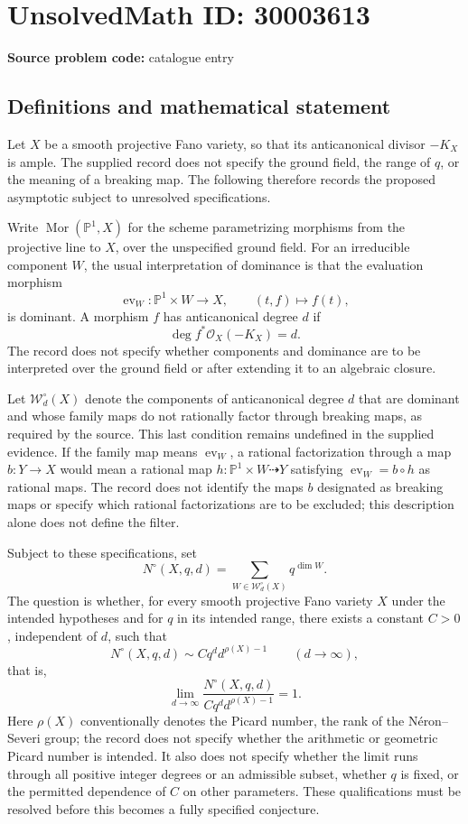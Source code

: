 \documentclass[11pt]{article}
\begin{document}
\section*{UnsolvedMath ID: 30003613}
\textbf{Source problem code:} catalogue entry
\subsection{Definitions and mathematical statement}
Let \(X\) be a smooth projective Fano variety, so that its anticanonical divisor \(-K_X\) is ample. The supplied record does not specify the ground field, the range of \(q\), or the meaning of a breaking map. The following therefore records the proposed asymptotic subject to unresolved specifications.

Write \(\operatorname{Mor}(\mathbb P^1,X)\) for the scheme parametrizing morphisms from the projective line to \(X\), over the unspecified ground field. For an irreducible component \(W\), the usual interpretation of dominance is that the evaluation morphism
\[
\operatorname{ev}_W:\mathbb P^1\times W\longrightarrow X,
\qquad (t,f)\longmapsto f(t),
\]
is dominant. A morphism \(f\) has anticanonical degree \(d\) if
\[
\deg f^*\mathcal O_X(-K_X)=d.
\]
The record does not specify whether components and dominance are to be interpreted over the ground field or after extending it to an algebraic closure.

Let \(\mathcal W_d^{\circ}(X)\) denote the components of anticanonical degree \(d\) that are dominant and whose family maps do not rationally factor through breaking maps, as required by the source. This last condition remains undefined in the supplied evidence. If the family map means \(\operatorname{ev}_W\), a rational factorization through a map \(b:Y\to X\) would mean a rational map \(h:\mathbb P^1\times W\dashrightarrow Y\) satisfying \(\operatorname{ev}_W=b\circ h\) as rational maps. The record does not identify the maps \(b\) designated as breaking maps or specify which rational factorizations are to be excluded; this description alone does not define the filter.

Subject to these specifications, set
\[
N^{\circ}(X,q,d)=\sum_{W\in\mathcal W_d^{\circ}(X)}q^{\dim W}.
\]
The question is whether, for every smooth projective Fano variety \(X\) under the intended hypotheses and for \(q\) in its intended range, there exists a constant \(C>0\), independent of \(d\), such that
\[
N^{\circ}(X,q,d)\sim Cq^d d^{\rho(X)-1}\qquad(d\to\infty),
\]
that is,
\[
\lim_{d\to\infty}\frac{N^{\circ}(X,q,d)}{Cq^d d^{\rho(X)-1}}=1.
\]
Here \(\rho(X)\) conventionally denotes the Picard number, the rank of the N\'eron--Severi group; the record does not specify whether the arithmetic or geometric Picard number is intended. It also does not specify whether the limit runs through all positive integer degrees or an admissible subset, whether \(q\) is fixed, or the permitted dependence of \(C\) on other parameters. These qualifications must be resolved before this becomes a fully specified conjecture.
\end{document}
